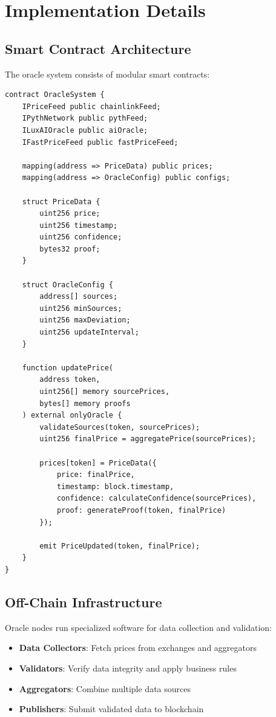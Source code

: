 \section{Implementation Details}


\subsection{Smart Contract Architecture}

The oracle system consists of modular smart contracts:

\begin{lstlisting}[caption={Oracle System Architecture}]
contract OracleSystem {
    IPriceFeed public chainlinkFeed;
    IPythNetwork public pythFeed;
    ILuxAIOracle public aiOracle;
    IFastPriceFeed public fastPriceFeed;
    
    mapping(address => PriceData) public prices;
    mapping(address => OracleConfig) public configs;
    
    struct PriceData {
        uint256 price;
        uint256 timestamp;
        uint256 confidence;
        bytes32 proof;
    }
    
    struct OracleConfig {
        address[] sources;
        uint256 minSources;
        uint256 maxDeviation;
        uint256 updateInterval;
    }
    
    function updatePrice(
        address token,
        uint256[] memory sourcePrices,
        bytes[] memory proofs
    ) external onlyOracle {
        validateSources(token, sourcePrices);
        uint256 finalPrice = aggregatePrice(sourcePrices);
        
        prices[token] = PriceData({
            price: finalPrice,
            timestamp: block.timestamp,
            confidence: calculateConfidence(sourcePrices),
            proof: generateProof(token, finalPrice)
        });
        
        emit PriceUpdated(token, finalPrice);
    }
}
\end{lstlisting}

\subsection{Off-Chain Infrastructure}

Oracle nodes run specialized software for data collection and validation:

\begin{itemize}
    \item \textbf{Data Collectors}: Fetch prices from exchanges and aggregators
    \item \textbf{Validators}: Verify data integrity and apply business rules
    \item \textbf{Aggregators}: Combine multiple data sources
    \item \textbf{Publishers}: Submit validated data to blockchain
\end{itemize}

